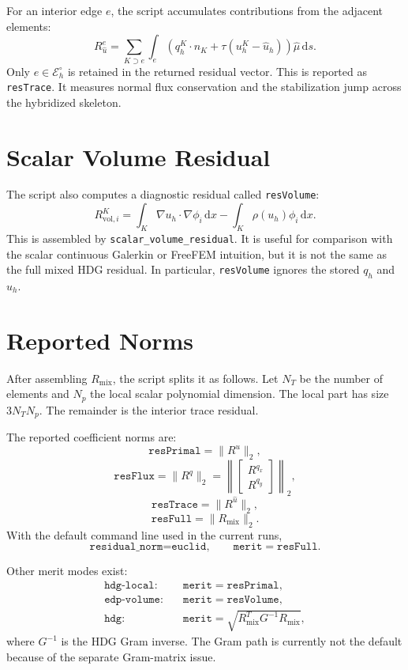 \documentclass[11pt]{article}
\newcommand{\uhat}{\widehat u}
\newcommand{\muhat}{\widehat\mu}
\newcommand{\Ehi}{\mathcal E_h^\circ}
\newcommand{\R}{\mathcal R}
\newcommand{\dd}{\,\mathrm d}
\begin{document}
For an interior edge \(e\), the script accumulates contributions from
the adjacent elements:
\[
  R^{e}_{\widehat u}
  =
  \sum_{K\supset e}
  \int_{e}
  \left(
    q_h^K\cdot n_K
    + \tau(u_h^K-\uhat_h)
  \right)\muhat
  \dd s .
\]
Only \(e\in\Ehi\) is retained in the returned residual vector.  This is
reported as \texttt{resTrace}.  It measures normal flux conservation and
the stabilization jump across the hybridized skeleton.

\section{Scalar Volume Residual}

The script also computes a diagnostic residual called
\texttt{resVolume}:
\[
  R^K_{\mathrm{vol},i}
  =
  \int_K \nabla u_h\cdot\nabla\phi_i\dd x
  -
  \int_K \rho(u_h)\phi_i\dd x.
\]
This is assembled by \texttt{scalar\_volume\_residual}.  It is useful for
comparison with the scalar continuous Galerkin or FreeFEM intuition, but
it is not the same as the full mixed HDG residual.  In particular,
\texttt{resVolume} ignores the stored \(q_h\) and \(\uhat_h\).

\section{Reported Norms}

After assembling \(R_{\mathrm{mix}}\), the script splits it as follows.
Let \(N_T\) be the number of elements and \(N_p\) the local scalar
polynomial dimension.  The local part has size \(3N_TN_p\).  The
remainder is the interior trace residual.

The reported coefficient norms are:
\[
  \texttt{resPrimal}
  =
  \|R^u\|_2,
\]
\[
  \texttt{resFlux}
  =
  \|R^q\|_2
  =
  \left\|
    \begin{bmatrix}
      R^{q_x}\\R^{q_y}
    \end{bmatrix}
  \right\|_2,
\]
\[
  \texttt{resTrace}
  =
  \|R^{\widehat u}\|_2,
\]
\[
  \texttt{resFull}
  =
  \|R_{\mathrm{mix}}\|_2.
\]
With the default command line used in the current runs,
\[
  \texttt{residual\_norm=euclid},
  \qquad
  \texttt{merit}=\texttt{resFull}.
\]

Other merit modes exist:
\begin{align*}
  \texttt{hdg-local}:&\quad \texttt{merit}=\texttt{resPrimal},\\
  \texttt{edp-volume}:&\quad \texttt{merit}=\texttt{resVolume},\\
  \texttt{hdg}:&\quad \texttt{merit}=\sqrt{R_{\mathrm{mix}}^T G^{-1}R_{\mathrm{mix}}},
\end{align*}
where \(G^{-1}\) is the HDG Gram inverse.  The Gram path is currently
not the default because of the separate Gram-matrix issue.
\end{document}
